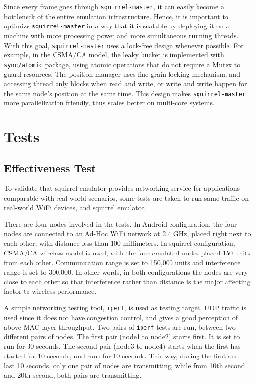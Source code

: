 \documentclass[12pt]{report}
\begin{document}
Since every frame goes through \texttt{squirrel-master}, it can easily become a bottleneck of the entire emulation infrastructure. Hence, it is important to optimize \texttt{squirrel-master} in a way that it is scalable by deploying it on a machine with more processing power and more simultaneous running threads. With this goal, \texttt{squirrel-master} uses a lock-free design whenever possible. For example, in the CSMA/CA model, the leaky bucket is implemented with \texttt{sync/atomic} package, using atomic operations that do not require a Mutex to guard resources. The position manager uses fine-grain locking mechanism, and accessing thread only blocks when read and write, or write and write happen for the same node's position at the same time. This design makes \texttt{squirrel-master} more parallelization friendly, thus scales better on multi-core systems.

\section{Tests}

\subsection{Effectiveness Test}

To validate that squirrel emulator provides networking service for applications comparable with real-world scenarios, some tests are taken to run same traffic on real-world WiFi devices, and squirrel emulator.

There are four nodes involved in the tests. In Android configuration, the four nodes are connected to an Ad-Hoc WiFi network at 2.4 GHz, placed right next to each other, with distance less than 100 millimeters. In squirrel configuration, CSMA/CA wireless model is used, with the four emulated nodes placed 150 units from each other. Communication range is set to 150,000 units and interference range is set to 300,000. In other words, in both configurations the nodes are very close to each other so that interference rather than distance is the major affecting factor to wireless performance.

A simple networking testing tool, \texttt{iperf}, is used as testing target. UDP traffic is used since it does not have congestion control, and gives a good perception of above-MAC-layer throughput. Two pairs of \texttt{iperf} tests are run, between two different pairs of nodes. The first pair (node1 to node2) starts first. It is set to run for 30 seconds. The second pair (node3 to node4) starts when the first has started for 10 seconds, and runs for 10 seconds. This way, during the first and last 10 seconds, only one pair of nodes are transmitting, while from 10th second and 20th second, both pairs are transmitting.
\end{document}
